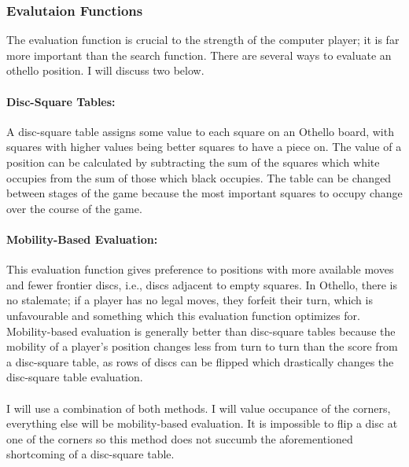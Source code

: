 \documentclass[12pt, a4paper]{report}
\begin{document}
\subsubsection{Evalutaion Functions}

The evaluation function is crucial to the strength of the computer player; it is far more important than the search function.
There are several ways to evaluate an othello position. I will discuss two below.

\paragraph{Disc-Square Tables:}

A disc-square table assigns some value to each square on an Othello board, with squares with higher values being better squares
to have a piece on. The value of a position can be calculated by subtracting the sum of
the squares which white occupies from the sum of those which black occupies. The table can be changed between stages of the game
because the most important squares to occupy change over the course of the game.

\paragraph{Mobility-Based Evaluation:}

This evaluation function gives preference to positions with more available moves and fewer frontier discs, i.e., discs adjacent to
empty squares. In Othello, there is no stalemate; if a player has no legal moves, they forfeit their turn, which is unfavourable
and something which this evaluation function optimizes for. Mobility-based evaluation is generally better than disc-square tables because
the mobility of a player's position changes less from turn to turn than the score from a disc-square table, as rows of discs can be
flipped which drastically changes the disc-square table evaluation.
\\ \\
I will use a combination of both methods.
I will value occupance of the corners, everything else will be mobility-based evaluation.
It is impossible to flip a disc at one of the corners so this method does not succumb the aforementioned shortcoming of a disc-square table. 
\end{document}
